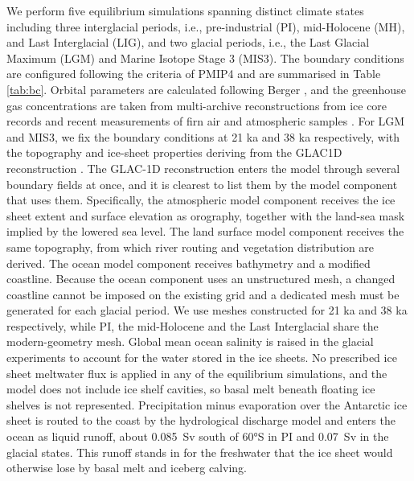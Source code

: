 \documentclass[pdflatex,sn-nature]{sn-jnl}
\begin{document}
We perform five equilibrium simulations spanning distinct climate states including three interglacial periods, i.e., pre-industrial (PI), mid-Holocene (MH), and Last Interglacial (LIG), and two glacial periods, i.e., the Last Glacial Maximum (LGM) and Marine Isotope Stage 3 (MIS3). The boundary conditions are configured following the criteria of PMIP4 \cite{otto2017pmip4} and are summarised in Table \ref{tab:bc}. Orbital parameters are calculated following Berger \cite{berger1977long}, and the greenhouse gas concentrations are taken from multi-archive reconstructions from ice core records and recent measurements of firn air and atmospheric samples \cite{fluckiger2002high,monnin2004evidence,schilt2010glacial,schneider2013reconstruction,kohler2017156}.  For LGM and MIS3, we fix the boundary conditions at 21 ka and 38 ka respectively, with the topography and ice-sheet properties deriving from the GLAC1D reconstruction \cite{tarasov2003greenland,tarasov2012data,briggs2014data}. The GLAC-1D reconstruction enters the model through several boundary fields at once, and it is clearest to list them by the model component that uses them. Specifically, the atmospheric model component receives the ice sheet extent and surface elevation as orography, together with the land-sea mask implied by the lowered sea level. The land surface model component receives the same topography, from which river routing and vegetation distribution are derived. The ocean model component receives bathymetry and a modified coastline. Because the ocean component uses an unstructured mesh, a changed coastline cannot be imposed on the existing grid and a dedicated mesh must be generated for each glacial period. We use meshes constructed for 21 ka and 38 ka respectively, while PI, the mid-Holocene and the Last Interglacial share the modern-geometry mesh. Global mean ocean salinity is raised in the glacial experiments to account for the water stored in the ice sheets. No prescribed ice sheet meltwater flux is applied in any of the equilibrium simulations, and the model does not include ice shelf cavities, so basal melt beneath floating ice shelves is not represented. Precipitation minus evaporation over the Antarctic ice sheet is routed to the coast by the hydrological discharge model and enters the ocean as liquid runoff, about 0.085~Sv south of 60°S in PI and 0.07~Sv in the glacial states. This runoff stands in for the freshwater that the ice sheet would otherwise lose by basal melt and iceberg calving.
\end{document}
